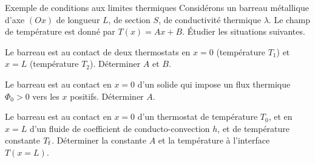 \documentclass[12pt,fancy]{cours}
\begin{document}
\begin{exemple}{Exemple de conditions aux limites thermiques}
Considérons un barreau métallique d'axe $(Ox)$ de longueur $L$, de section $S$, de conductivité thermique $\lambda$. Le champ de température est donné par $T(x)=Ax+B$.  Étudier les situations suivantes.
\begin{quest}
  \item Le  barreau est au contact de deux thermostats en $x=0$ (température $T_1$) et $x=L$ (température $T_2$). Déterminer $A$ et $B$.
  \item Le barreau est au contact en $x=0$ d'un solide qui impose un flux thermique $\Phi_0>0$ vers les $x$ positifs. Déterminer $A$.
  \item Le barreau est au contact en $x=0$ d'un thermostat de température $T_0$, et en $x=L$ d'un fluide de coefficient de conducto-convection $h$, et de température constante $T_{\rm f}$. Déterminer la constante $A$ et la température à l'interface $T(x=L)$.
\end{quest}
\end{exemple}
\end{document}
